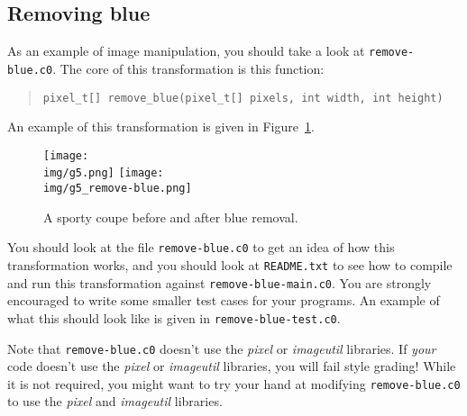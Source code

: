\subsection{Removing blue}
\label{sect:remove-blue}

As an example of image manipulation, you should take a look at
\lstinline'remove-blue.c0'. The core of this transformation is this
function:
\begin{quote}
\begin{lstlisting}
pixel_t[] remove_blue(pixel_t[] pixels, int width, int height)
\end{lstlisting}
\end{quote}
An example of this transformation is given in
Figure~\ref{fig:g5_remove-blue}.

\begin{figure}
\begin{center}
\texttt{[image: \\img/g5.png]}
\quad
\texttt{[image: \\img/g5\_remove-blue.png]}
\end{center}
\caption{A sporty coupe before and after blue removal.}
\label{fig:g5_remove-blue}
\end{figure}

You should look at the file \lstinline'remove-blue.c0' to get an idea
of how this transformation works, and you should look at
\lstinline'README.txt' to see how to compile and run this
transformation against \lstinline'remove-blue-main.c0'.  You are
strongly encouraged to write some smaller test cases for your
programs. An example of what this should look like is given in
\lstinline'remove-blue-test.c0'.

Note that \lstinline'remove-blue.c0' doesn't use the \emph{pixel} or
\emph{imageutil} libraries. If \emph{your} code doesn't use the
\emph{pixel} or \emph{imageutil} libraries, you will fail style
grading!  While it is not required, you might want to try your hand at
modifying \lstinline'remove-blue.c0' to use the \emph{pixel} and
\emph{imageutil} libraries.









